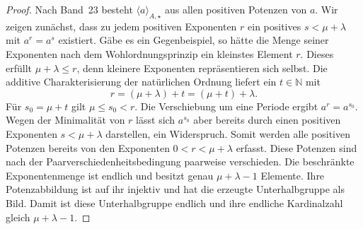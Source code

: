 \documentclass[main.tex]{subfiles}
\begin{document}
\begin{proof}
Nach Band~23 besteht \(\langle a\rangle_{A,\star}\) aus allen positiven
Potenzen von \(a\).  Wir zeigen zunächst, dass zu jedem positiven Exponenten
\(r\) ein positives \(s<\mu+\lambda\) mit \(a^r=a^s\) existiert.  Gäbe es
ein Gegenbeispiel, so hätte die Menge seiner Exponenten nach dem
Wohlordnungsprinzip ein kleinstes Element \(r\).  Dieses erfüllt
\(\mu+\lambda\leq r\), denn kleinere Exponenten repräsentieren sich selbst.
Die additive Charakterisierung der natürlichen Ordnung liefert ein
\(t\in\mathbb N\) mit
\[
  r=(\mu+\lambda)+t=(\mu+t)+\lambda.
\]
Für \(s_0=\mu+t\) gilt \(\mu\leq s_0<r\).  Die Verschiebung um eine
Periode ergibt \(a^r=a^{s_0}\).  Wegen der Minimalität von \(r\) lässt sich
\(a^{s_0}\) aber bereits durch einen positiven Exponenten
\(s<\mu+\lambda\) darstellen, ein Widerspruch.  Somit werden
alle positiven Potenzen bereits von den Exponenten
\(0<r<\mu+\lambda\) erfasst.  Diese Potenzen sind nach der
Paarverschiedenheitsbedingung paarweise verschieden.  Die beschränkte
  Exponentenmenge ist endlich und besitzt genau \(\mu+\lambda-1\)
Elemente.  Ihre Potenzabbildung ist auf ihr injektiv und hat die erzeugte
Unterhalbgruppe als Bild.  Damit ist diese Unterhalbgruppe endlich und ihre
  endliche Kardinalzahl gleich \(\mu+\lambda-1\).
\end{proof}

\end{document}
